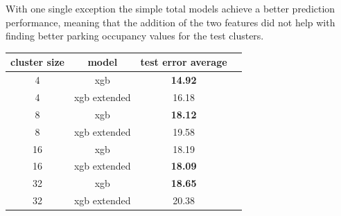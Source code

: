 With one single exception the simple total models achieve a better prediction performance, meaning that the addition of the two features did not help with finding better parking occupancy values for the test clusters.

\begin{table}[!ht]
	{\begin{tabular}{ | c | c | c | c | }
		\hline		
		\textbf{cluster size}  & \textbf{model} & \textbf{test error average} \\ \hline
		4 & {xgb} & \textbf{14.92} \\ \hline
		4 & {xgb extended} & 16.18 \\ \hline \hline
		8 & {xgb} & \textbf{18.12} \\ \hline
		8 & {xgb extended} & 19.58 \\ \hline \hline
		16 & {xgb} & 18.19 \\ \hline
		16 & {xgb extended} & \textbf{18.09} \\ \hline \hline
		32 & {xgb} & \textbf{18.65} \\ \hline
		32 & {xgb extended} & 20.38 \\ \hline
	\end{tabular}}
	\label{tab:extended_models_comparison}
\end{table}
	
